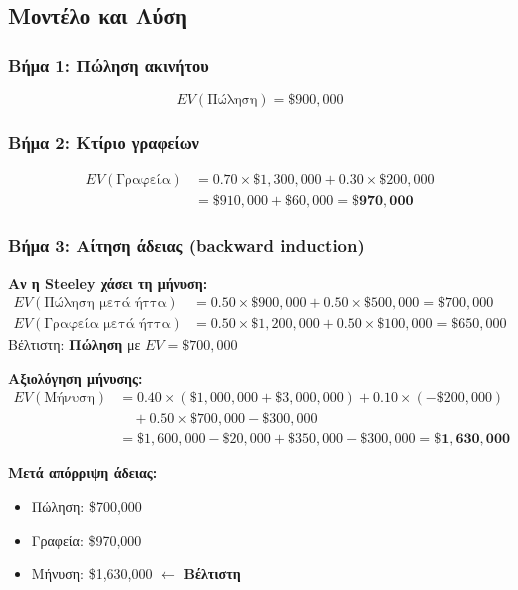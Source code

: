 \documentclass[a4paper,12pt]{article}
\begin{document}
\subsection{Μοντέλο και Λύση}

\subsubsection{Βήμα 1: Πώληση ακινήτου}
\[
EV(\text{Πώληση}) = \$900{,}000
\]

\subsubsection{Βήμα 2: Κτίριο γραφείων}
\begin{align}
EV(\text{Γραφεία}) &= 0.70 \times \$1{,}300{,}000 + 0.30 \times \$200{,}000 \nonumber \\
&= \$910{,}000 + \$60{,}000 = \mathbf{\$970{,}000}
\end{align}

\subsubsection{Βήμα 3: Αίτηση άδειας (backward induction)}

\textbf{Αν η Steeley χάσει τη μήνυση:}
\begin{align}
EV(\text{Πώληση μετά ήττα}) &= 0.50 \times \$900{,}000 + 0.50 \times \$500{,}000 = \$700{,}000 \\
EV(\text{Γραφεία μετά ήττα}) &= 0.50 \times \$1{,}200{,}000 + 0.50 \times \$100{,}000 = \$650{,}000
\end{align}
Βέλτιστη: \textbf{Πώληση} με $EV = \$700{,}000$

\textbf{Αξιολόγηση μήνυσης:}
\begin{align}
EV(\text{Μήνυση}) &= 0.40 \times (\$1{,}000{,}000 + \$3{,}000{,}000) + 0.10 \times (-\$200{,}000) \nonumber \\
&\quad + 0.50 \times \$700{,}000 - \$300{,}000 \nonumber \\
&= \$1{,}600{,}000 - \$20{,}000 + \$350{,}000 - \$300{,}000 = \mathbf{\$1{,}630{,}000}
\end{align}

\textbf{Μετά απόρριψη άδειας:}
\begin{itemize}
    \item Πώληση: \$700,000
    \item Γραφεία: \$970,000
    \item Μήνυση: \$1,630,000 $\leftarrow$ \textbf{Βέλτιστη}
\end{itemize}
\end{document}
